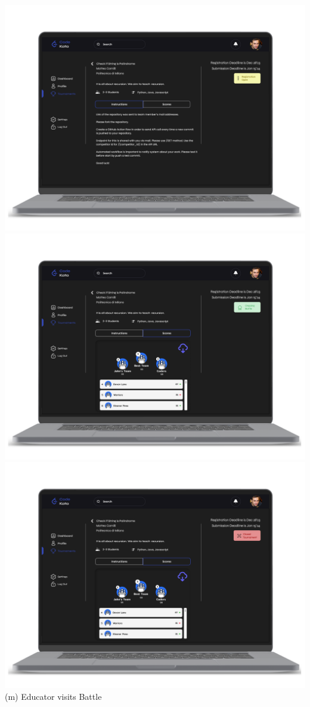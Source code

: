 \newpage
\begin{center}
\includegraphics[scale=0.13]{Images/ui-ux/educator_battle/educator_battle_1.png}
\includegraphics[scale=0.13]{Images/ui-ux/educator_battle/educator_battle_2.png}
\includegraphics[scale=0.13]{Images/ui-ux/educator_battle/educator_battle_3.png}
\\ (m) Educator visits Battle
\end{center}

